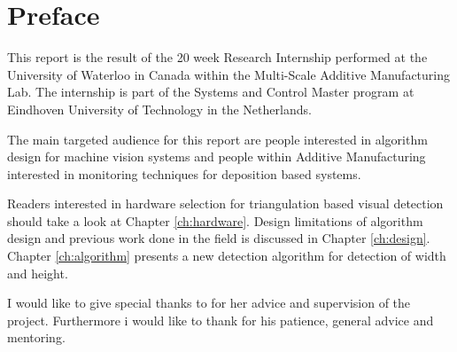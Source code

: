 {}

\chapter*{Preface}

This report is the result of the 20 week Research Internship performed at the University of Waterloo in Canada within the Multi-Scale Additive Manufacturing Lab. The internship is part of the Systems and Control Master program at Eindhoven University of Technology in the Netherlands.

The main targeted audience for this report are people interested in algorithm design for machine vision systems and people within Additive Manufacturing interested in monitoring techniques for deposition based systems.

Readers interested in hardware selection for triangulation based visual detection should take a look at Chapter \ref{ch:hardware}. Design limitations of algorithm design and previous work done in the field is discussed in Chapter \ref{ch:design}. Chapter \ref{ch:algorithm} presents a new detection algorithm for detection of width and height.

I would like to give special thanks to \myOtherSupervisor for her advice and supervision of the project. Furthermore i would like to thank \mySupervisor for his patience, general advice and mentoring.


\cleardoublepage

